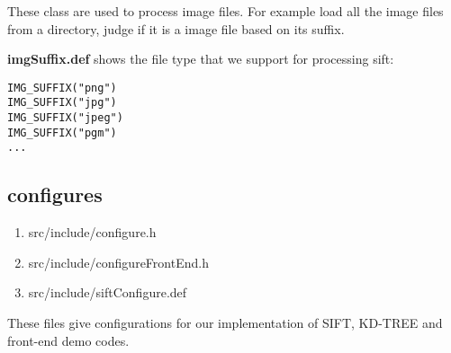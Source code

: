 \documentclass[paper=a4, fontsize=11pt]{scrartcl} %
\numberwithin{equation}{section} %
\numberwithin{figure}{section} %
\numberwithin{table}{section} %
\begin{document}
These class are used to process image files. For example load all the image files from a directory, judge if it is a image file based on its suffix.

\textbf{imgSuffix.def} shows the file type that we support for processing sift:

\begin{lstlisting}
IMG_SUFFIX("png")
IMG_SUFFIX("jpg")
IMG_SUFFIX("jpeg")
IMG_SUFFIX("pgm")
...
\end{lstlisting}


\subsection{configures}

\begin{enumerate}
    \item src/include/configure.h
    \item src/include/configureFrontEnd.h
    \item src/include/siftConfigure.def
\end{enumerate}

These files give configurations for our implementation of SIFT, KD-TREE and front-end demo codes.



\end{document}
